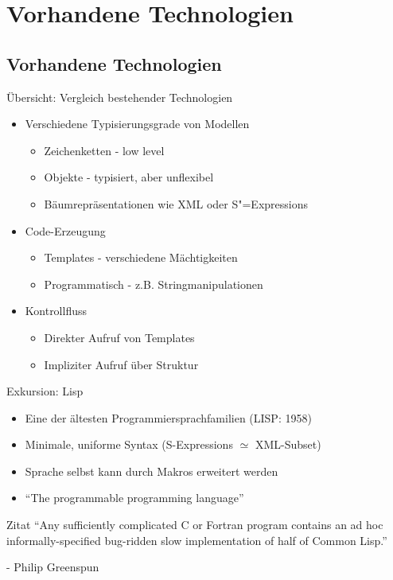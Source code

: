 \documentclass{beamer}
\newcommand{\sexps}{S"=Expressions}
\begin{document}
\section{Vorhandene Technologien}
\subsection{Vorhandene Technologien}

\begin{frame}{Übersicht: Vergleich bestehender Technologien}
  \begin{itemize}
  \item Verschiedene Typisierungsgrade von Modellen
    \begin{itemize}
    \item Zeichenketten - low level
    \item Objekte - typisiert, aber unflexibel
    \item Bäumrepräsentationen wie XML oder \sexps{}
    \end{itemize}
  \item Code-Erzeugung
    \begin{itemize}
    \item Templates - verschiedene Mächtigkeiten
    \item Programmatisch - z.B. Stringmanipulationen
    \end{itemize}
  \item Kontrollfluss
    \begin{itemize}
    \item Direkter Aufruf von Templates
    \item Impliziter Aufruf über Struktur
    \end{itemize}
  \end{itemize}
\end{frame}

\begin{frame}{Exkursion: Lisp}
  \begin{itemize}
  \item Eine der ältesten Programmiersprachfamilien (LISP: 1958)
  \item Minimale, uniforme Syntax (S-Expressions $\simeq$ XML-Subset)
  \item Sprache selbst kann durch Makros erweitert werden 
  \item[]  ``The programmable programming language''
  \end{itemize}

  \begin{block}{Zitat}
    ``Any sufficiently complicated C or Fortran program contains an ad hoc
    informally-specified bug-ridden slow implementation of half of
    Common Lisp.''

    - Philip Greenspun 
  \end{block}
\end{frame}
\end{document}
